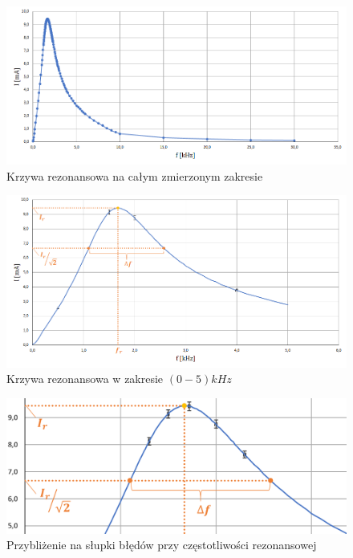 \documentclass[polish, 11pt, a4paper]{article}
\begin{document}
    	\begin{figure}[H]
    		\centering
    		\caption{Krzywa rezonansowa na całym zmierzonym zakresie}
    		\includegraphics[width=\textwidth]{Fizyka54Wykres1}
    	\end{figure}
    
    	\begin{figure}[H]
    		\centering
    		\caption{Krzywa rezonansowa w zakresie \((0 - 5) kHz\)}
    		\includegraphics[width=\textwidth]{Fizyka54Wykres2}
    	\end{figure}
    	
    	\begin{figure}[H]
    		\centering
    		\caption{Przybliżenie na słupki błędów przy częstotliwości rezonansowej}
    		\includegraphics[width=\textwidth]{Fizyka54Wykres3}
    	\end{figure}
    	
\end{document}
